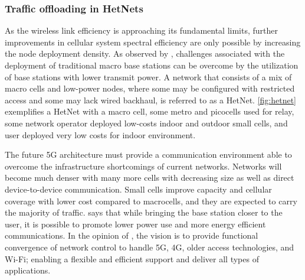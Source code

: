 
\subsubsection{Traffic offloading in \acsp{HetNet}}
\label{subsec:heterogeneous}

As the wireless link efficiency is approaching its fundamental limits, further
improvements in cellular system spectral efficiency are only possible by
increasing the node deployment density. As observed by \citet{Damnjanovic2011},
challenges associated with the deployment of traditional macro base stations
can be overcome by the utilization of base stations with lower transmit power.
A network that consists of a mix of macro cells and low-power nodes, where some
may be configured with restricted access and some may lack wired backhaul, is
referred to as a \acf{HetNet}. \autoref{fig:hetnet} exemplifies a \ac{HetNet}
with a macro cell, some metro and picocells used for relay, some network
operator deployed low-costs indoor and outdoor small cells, and user deployed
very low costs for indoor environment.

The future 5G architecture must provide a communication environment able to
overcome the infrastructure shortcomings of current networks. Networks will
become much denser with many more cells with decreasing size as well as direct
device-to-device communication. Small cells improve capacity and cellular
coverage with lower cost compared to macrocells, and they are expected to carry
the majority of traffic. \citet{Pierucci2015} says that while bringing the base
station closer to the user, it is possible to promote lower power use and more
energy efficient communications. In the opinion of \citet{Einsiedler2015}, the
vision is to provide functional convergence of network control to handle 5G,
4G, older access technologies, and Wi-Fi; enabling a flexible and efficient
support and deliver all types of applications.

